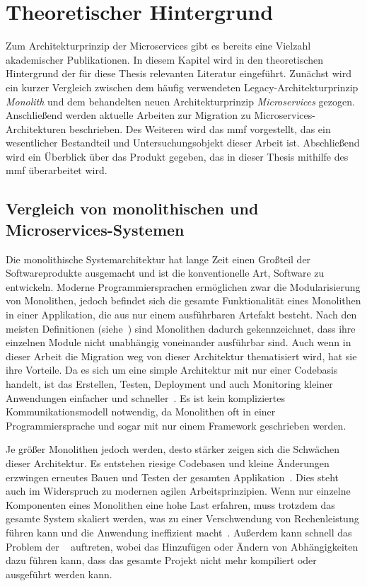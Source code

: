\chapter{Theoretischer Hintergrund}
\label{chap:theoretischer-hintergrund}
Zum Architekturprinzip der Microservices gibt es bereits eine Vielzahl akademischer Publikationen.
In diesem Kapitel wird in den theoretischen Hintergrund der für diese Thesis relevanten Literatur eingeführt.
Zunächst wird ein kurzer Vergleich zwischen dem häufig verwendeten Legacy-Architekturprinzip \emph{Monolith} und dem behandelten neuen Architekturprinzip \emph{Microservices} gezogen.
Anschließend werden aktuelle Arbeiten zur Migration zu Microservices-Architekturen beschrieben.
Des Weiteren wird das \acrfull{mmf} vorgestellt, das ein wesentlicher Bestandteil und Untersuchungsobjekt dieser Arbeit ist.
Abschließend wird ein Überblick über das Produkt gegeben, das in dieser Thesis mithilfe des \gls{mmf} überarbeitet wird.

\section{Vergleich von monolithischen und Microservices-Systemen}
\label{sec:monolith-vs-microservices}

Die monolithische Systemarchitektur hat lange Zeit einen Großteil der Softwareprodukte ausgemacht und ist die konventionelle Art, Software zu entwickeln.
Moderne Programmiersprachen ermöglichen zwar die Modularisierung von Monolithen, jedoch befindet sich die gesamte Funktionalität eines Monolithen in einer Applikation, die aus nur einem ausführbaren Artefakt besteht.
Nach den meisten Definitionen (siehe~\cite{Dragoni2017}) sind Monolithen dadurch gekennzeichnet, dass ihre einzelnen Module nicht unabhängig voneinander ausführbar sind.
Auch wenn in dieser Arbeit die Migration weg von dieser Architektur thematisiert wird, hat sie ihre Vorteile.
Da es sich um eine simple Architektur mit nur einer Codebasis handelt, ist das Erstellen, Testen, Deployment und auch Monitoring kleiner Anwendungen einfacher und schneller~\cite{a-survey-on}.
Es ist kein kompliziertes Kommunikationsmodell notwendig, da Monolithen oft in einer Programmiersprache und sogar mit nur einem Framework geschrieben werden.

Je größer Monolithen jedoch werden, desto stärker zeigen sich die Schwächen dieser Architektur.
Es entstehen riesige Codebasen und kleine Änderungen erzwingen erneutes Bauen und Testen der gesamten Applikation~\cite{Dragoni2017}.
Dies steht auch im Widerspruch zu modernen agilen Arbeitsprinzipien.
Wenn nur einzelne Komponenten eines Monolithen eine hohe Last erfahren, muss trotzdem das gesamte System skaliert werden, was zu einer Verschwendung von Rechenleistung führen kann und die Anwendung ineffizient macht~\cite{Dragoni2017}.
Außerdem kann schnell das Problem der ~\cite{Dragoni2017} auftreten, wobei das Hinzufügen oder Ändern von Abhängigkeiten dazu führen kann, dass das gesamte Projekt nicht mehr kompiliert oder ausgeführt werden kann.

